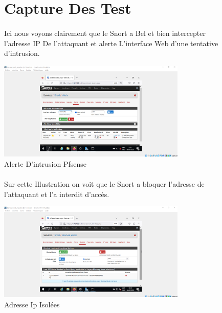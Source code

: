 \begin{figure}[h]
	\section{Capture Des Test}
	\paragraph{}
	Ici nous voyons clairement que le Snort a Bel et bien intercepter l'adresse IP
	De l'attaquant  et alerte L'interface Web d'une tentative d'intrusion.
 \begin{center}
			\includegraphics[width=0.8\textwidth]{photo_memoireConfig/Alert_ip.png}
		\caption{Alerte D'intrusion Pfsense}
	\end{center}
\end{figure}
 
\begin{figure}[h]
	\paragraph{}
	Sur cette Illustration on voit que le Snort a bloquer l'adresse de l'attaquant et l'a interdit d'accès.
	 \begin{center}
		\includegraphics[width=0.8\textwidth]{photo_memoireConfig/Blocked_IP.png}
		\caption{Adresse Ip Isolées}
 \end{center}
\end{figure}
 
